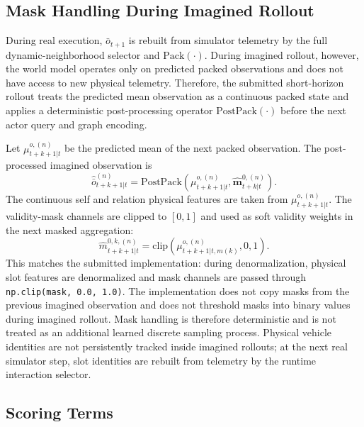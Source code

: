 \documentclass[journal]{IEEEtran}
\begin{document}
\subsection{Mask Handling During Imagined Rollout}
\label{supp:rollout_mask}

During real execution, $\bar{o}_{t+1}$ is rebuilt from simulator
telemetry by the full dynamic-neighborhood selector and
$\mathrm{Pack}(\cdot)$. During imagined rollout, however, the world
model operates only on predicted packed observations and does not have
access to new physical telemetry. Therefore, the submitted short-horizon
rollout treats the predicted mean observation as a continuous packed
state and applies a deterministic post-processing operator
$\mathrm{PostPack}(\cdot)$ before the next actor query and graph
encoding.

Let $\mu_{t+k+1|t}^{o,(n)}$ be the predicted mean of the next packed
observation. The post-processed imagined observation is
\begin{equation}
\hat{\bar{o}}_{t+k+1|t}^{(n)}
=
\mathrm{PostPack}
(
\mu_{t+k+1|t}^{o,(n)},
\hat{\mathbf m}_{t+k|t}^{0,(n)}
).
\end{equation}
The continuous self and relation physical features are taken from
$\mu_{t+k+1|t}^{o,(n)}$. The validity-mask channels are clipped to
$[0,1]$ and used as soft validity weights in the next masked
aggregation:
\begin{equation}
\hat m_{t+k+1|t}^{0,k,(n)}
=
\mathrm{clip}
(
\mu_{t+k+1|t,m(k)}^{o,(n)},
0,
1
).
\end{equation}
This matches the submitted implementation: during denormalization, physical slot features are denormalized and mask channels are passed through \texttt{np.clip(mask, 0.0, 1.0)}. The implementation does not copy masks from the previous imagined observation and does not threshold masks into binary values during imagined rollout. Mask handling is therefore deterministic and is not treated as an additional learned discrete sampling process. Physical vehicle identities are not persistently tracked
inside imagined rollouts; at the next real simulator step, slot
identities are rebuilt from telemetry by the runtime interaction
selector.

\subsection{Scoring Terms}
\label{supp:scoring_terms}
\end{document}
